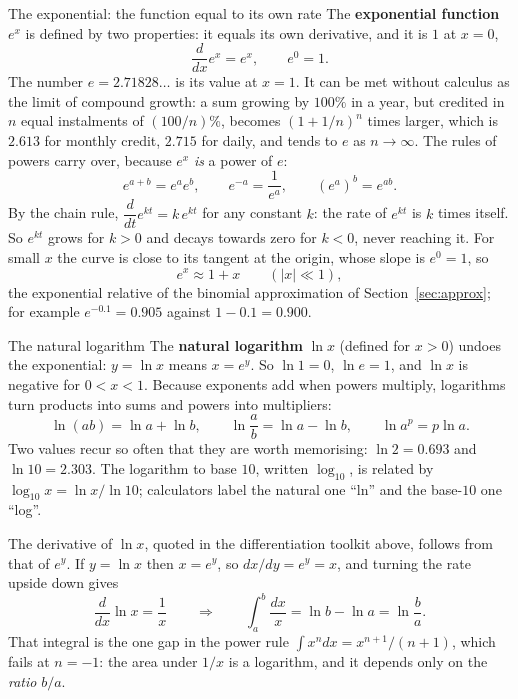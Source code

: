 \begin{defbox}{The exponential: the function equal to its own rate}
The \textbf{exponential function} $e^{x}$ is defined by two properties: it equals its own derivative,
and it is $1$ at $x=0$,
\[
\frac{d}{dx}e^{x}=e^{x},\qquad e^{0}=1.
\]
The number $e=2.71828\ldots$ is its value at $x=1$. It can be met without calculus as the limit of
compound growth: a sum growing by $100\%$ in a year, but credited in $n$ equal instalments of
$(100/n)\%$, becomes $(1+1/n)^{n}$ times larger, which is $2.613$ for monthly credit, $2.715$ for daily,
and tends to $e$ as $n\to\infty$. The rules of powers carry over, because $e^{x}$ \emph{is} a power of
$e$:
\[
e^{a+b}=e^{a}e^{b},\qquad e^{-a}=\frac{1}{e^{a}},\qquad (e^{a})^{b}=e^{ab}.
\]
By the chain rule, $\dfrac{d}{dt}e^{kt}=k\,e^{kt}$ for any constant $k$: the rate of $e^{kt}$ is $k$ times
itself. So $e^{kt}$ grows for $k>0$ and decays towards zero for $k<0$, never reaching it. For small $x$
the curve is close to its tangent at the origin, whose slope is $e^{0}=1$, so
\[
e^{x}\approx1+x\qquad(|x|\ll1),
\]
the exponential relative of the binomial approximation of Section~\ref{sec:approx}; for example
$e^{-0.1}=0.905$ against $1-0.1=0.900$.
\end{defbox}

\begin{defbox}{The natural logarithm}
The \textbf{natural logarithm} $\ln x$ (defined for $x>0$) undoes the exponential: $y=\ln x$ means
$x=e^{y}$. So $\ln1=0$, $\ln e=1$, and $\ln x$ is negative for $0<x<1$. Because exponents add when
powers multiply, logarithms turn products into sums and powers into multipliers:
\[
\ln(ab)=\ln a+\ln b,\qquad \ln\frac{a}{b}=\ln a-\ln b,\qquad \ln a^{p}=p\ln a.
\]
Two values recur so often that they are worth memorising: $\ln2=0.693$ and $\ln10=2.303$. The
logarithm to base $10$, written $\log_{10}$, is related by $\log_{10}x=\ln x/\ln10$; calculators label
the natural one ``ln'' and the base-$10$ one ``log''.

The derivative of $\ln x$, quoted in the differentiation toolkit above, follows from that of $e^{y}$. If
$y=\ln x$ then $x=e^{y}$, so $dx/dy=e^{y}=x$, and turning the rate upside down gives
\[
\frac{d}{dx}\ln x=\frac{1}{x}\qquad\Longrightarrow\qquad \int_a^b\frac{dx}{x}=\ln b-\ln a=\ln\frac{b}{a}.
\]
That integral is the one gap in the power rule $\int x^{n}dx=x^{n+1}/(n+1)$, which fails at $n=-1$:
the area under $1/x$ is a logarithm, and it depends only on the \emph{ratio} $b/a$.
\end{defbox}

